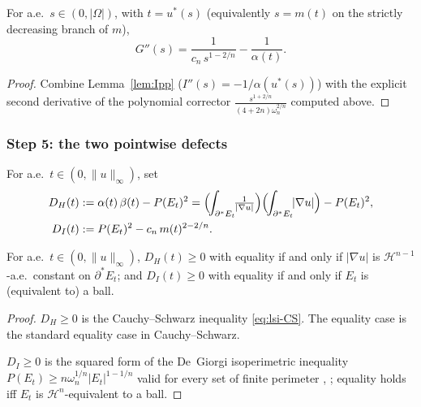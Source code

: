 \begin{lemma}\label{lem:Gpp}
For a.e.\ $s\in(0,|\Omega|)$, with $t=u^{*}(s)$ (equivalently $s=m(t)$ on
the strictly decreasing branch of $m$),
\begin{equation}\label{eq:lsi-Gpp}
   G''(s)=\frac{1}{c_{n}\,s^{1-2/n}}-\frac{1}{\alpha(t)}.
\end{equation}
\end{lemma}

\begin{proof}
Combine Lemma~\ref{lem:Ipp} ($I''(s)=-1/\alpha(u^{*}(s))$) with the
explicit second derivative of the polynomial corrector
$\frac{s^{1+2/n}}{(4+2n)\omega_{n}^{2/n}}$ computed above.
\end{proof}

\subsubsection{Step 5: the two pointwise defects}
\label{sssec:lsi-DHDI}

\begin{definition}\label{def:DHDI}
For a.e.\ $t\in(0,\|u\|_{\infty})$, set
\begin{align}
   D_{H}(t)
   &:=\alpha(t)\,\beta(t)-P(E_{t})^{2}
    =\Bigl(\!\int_{\partial^{*}E_{t}}\!\!\tfrac{1}{|\nabla u|}\Bigr)
      \Bigl(\!\int_{\partial^{*}E_{t}}\!\!|\nabla u|\Bigr)-P(E_{t})^{2},
   \label{eq:lsi-DH}\\
   D_{I}(t)
   &:=P(E_{t})^{2}-c_{n}\,m(t)^{2-2/n}.
   \label{eq:lsi-DI}
\end{align}
\end{definition}

\begin{lemma}\label{lem:DH-DI-pos}\label{lem:lsid:CS-defect}\label{prop:lsid:CS-defect}
For a.e.\ $t\in(0,\|u\|_{\infty})$, $D_{H}(t)\ge 0$ with equality if and
only if $|\nabla u|$ is $\mathcal H^{n-1}$-a.e.\ constant on
$\partial^{*}E_{t}$; and $D_{I}(t)\ge 0$ with equality if and only if
$E_{t}$ is (equivalent to) a ball.
\end{lemma}

\begin{proof}
$D_{H}\ge 0$ is the Cauchy--Schwarz inequality \eqref{eq:lsi-CS}. The
equality case is the standard equality case in Cauchy--Schwarz.

$D_{I}\ge 0$ is the squared form of the De~Giorgi isoperimetric
inequality $P(E_{t})\ge n\omega_{n}^{1/n}|E_{t}|^{1-1/n}$ valid for every
set of finite perimeter \cite[Theorem~II]{DeGiorgi1958},
\cite[Theorem 14.1]{Maggi2012}; equality holds iff $E_{t}$ is
$\mathcal H^{n}$-equivalent to a ball.
\end{proof}

